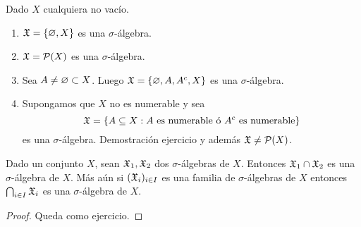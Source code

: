 \begin{eg}
    Dado $X$ cualquiera no vacío.
    \begin{enumerate}
        \item $\mathfrak{X} = \{ \varnothing, X \}$ es una $\sigma$-álgebra.
        \item $\mathfrak{X} = \mathcal{P}(X)$ es una $\sigma$-álgebra.
        \item Sea $A \neq \varnothing \subset X$. Luego $\mathfrak{X} = \{ \varnothing, A, A^c, X \}$ es una $\sigma$-álgebra.
        \item Supongamos que $X$ no es numerable y sea
              \begin{equation*}
                  \mathfrak{X} = \{ A \subseteq X : A \text{ es numerable ó } A^c \text{ es numerable} \}
              \end{equation*}
              es una $\sigma$-álgebra. Demostración ejercicio y además $\mathfrak{X} \neq \mathcal{P}(X)$.
    \end{enumerate}
\end{eg}

\clearpage

\begin{lemma}
    Dado un conjunto $X$, sean $\mathfrak{X}_1, \mathfrak{X}_2$ dos $\sigma$-álgebras de $X$. Entonces $\mathfrak{X}_1 \cap \mathfrak{X}_2$ es una $\sigma$-álgebra de $X$.
    Más aún si $(\mathfrak{X}_i)_{i \in I}$ es una familia de $\sigma$-álgebras de $X$ entonces $\bigcap_{i \in I} \mathfrak{X}_i$ es una $\sigma$-álgebra de $X$.
    \begin{proof}
        Queda como ejercicio.
    \end{proof}
\end{lemma}

